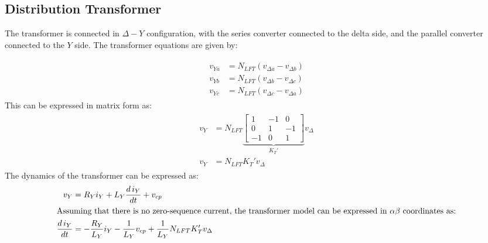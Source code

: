 \subsection{Distribution Transformer}

The transformer is connected in $\Delta-Y$ configuration, with the series converter connected to the delta side, and the parallel converter connected to the $Y$ side. The transformer equations are given by:

\begin{align}
    \begin{aligned}
        v_{Ya} &= N_{LFT}(v_{\Delta a} - v_{\Delta b}) \\
        v_{Yb} &= N_{LFT}(v_{\Delta b} - v_{\Delta c}) \\
        v_{Yc} &= N_{LFT}(v_{\Delta c} - v_{\Delta a})
    \end{aligned}
\end{align}
This can be expressed in matrix form as:
\begin{align}
    \begin{aligned}
        v_Y &= N_{LFT}
        \underbrace{
        \begin{bmatrix}
            1 & -1 & 0 \\
            0 & 1 & -1 \\
            -1 & 0 & 1
        \end{bmatrix}
        }_{K_T'}
        v_{\Delta}\\
        v_Y &= N_{LFT} K_T' v_{\Delta}
    \end{aligned}
\end{align}
The dynamics of the transformer can be expressed as:
\begin{align}
    v_{Y} &= R_Yi_Y + L_Y\dfrac{d\,i_Y}{dt} + v_{cp} \\
    \intertext{Assuming that there is no zero-sequence current, the transformer model can be expressed in $\alpha\beta$ coordinates as:}
    \dfrac{d\,i_Y}{dt} &= -\dfrac{R_Y}{L_Y}i_Y - \dfrac{1}{L_Y}v_{cp} + \dfrac{1}{L_Y}N_{LFT}K_T'v_{\Delta}
\end{align}

